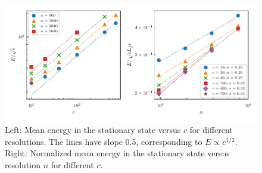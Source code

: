 \begin{figure}
\centerline{\includegraphics[width=5.8in]{../Pyfig/fig_energy_w}}
\caption{Left: Mean energy in the stationary state versus $ c $ for different
resolutions. The lines have slope $ 0.5 $, corresponding to $ E \propto c^{1/2}
$. Right: Normalized mean energy in the stationary state versus resolution $ n
$ for different $ c $.}
\label{MeanE}
\end{figure}



